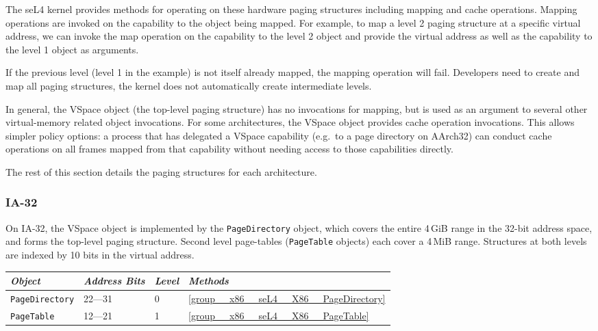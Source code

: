 The seL4 kernel provides methods for operating on these hardware paging structures including mapping
and cache operations. Mapping operations are invoked on the capability to the object being mapped.
For example, to map a level 2 paging structure at a specific virtual address, we can invoke the map
operation on the capability to the level 2 object and provide the virtual address as well as the
capability to the level 1 object as arguments.

If the previous level (level 1 in the example) is not itself already mapped, the mapping operation
will fail. Developers need to create and map all paging structures, the kernel does not
automatically create intermediate levels.

In general, the VSpace object (the top-level paging structure) has no invocations for mapping, but
is used as an argument to several other virtual-memory related object invocations. For some
architectures, the VSpace object provides cache operation invocations. This allows simpler
policy options: a process that has delegated a VSpace capability (e.g.\ to a page directory on
AArch32) can conduct cache operations on all frames mapped from that capability without needing
access to those capabilities directly.

The rest of this section details the paging structures for each architecture.

\subsubsection{IA-32}

On IA-32, the VSpace object is implemented by the \texttt{PageDirectory} object, which covers the
entire 4\,GiB range in the 32-bit address space, and forms the top-level paging structure. Second
level page-tables (\texttt{PageTable} objects) each cover a 4\,MiB range. Structures at both levels
are indexed by 10 bits in the virtual address.

\begin{tabularx}{\textwidth}{Xlll} \toprule
\emph{Object}          & \emph{Address Bits} & \emph{Level} & \emph{Methods} \\ \midrule
\texttt{PageDirectory} & 22---31             & 0            & \autoref{group__x86__seL4__X86__PageDirectory} \\
\texttt{PageTable}     & 12---21             & 1            & \autoref{group__x86__seL4__X86__PageTable} \\
\bottomrule
\end{tabularx}

